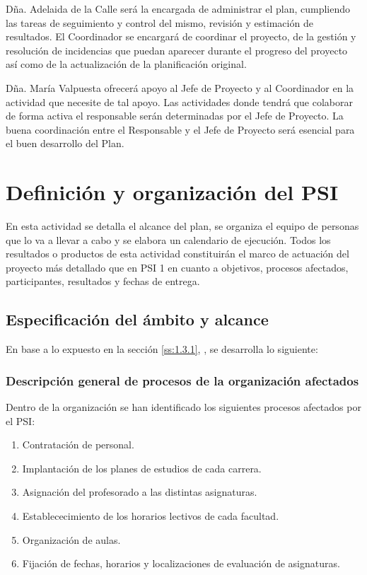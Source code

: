 \documentclass[11pt,a4paper,spanish,twoside]{book}
\begin{document}
Dña. Adelaida de la Calle será la encargada de administrar el plan,
cumpliendo las tareas de seguimiento y control del mismo, revisión y 
estimación de resultados. El Coordinador se encargará de coordinar el
proyecto, de la gestión y resolución de incidencias que puedan aparecer 
durante el progreso del proyecto así como de la actualización de la 
planificación original.

Dña. María Valpuesta ofrecerá apoyo al Jefe de Proyecto y al Coordinador en
la actividad que necesite de tal apoyo. Las actividades donde tendrá que 
colaborar de forma activa el responsable serán determinadas por el Jefe de 
Proyecto. La buena coordinación entre el Responsable y el Jefe de Proyecto 
será esencial para el buen desarrollo del Plan.


\chapter{Definición y organización del PSI}
En esta actividad se detalla el alcance del plan, se organiza el equipo de
personas que lo va a llevar a cabo y se elabora un calendario de
ejecución. Todos los resultados o productos de esta actividad constituirán el
marco de actuación del proyecto más detallado que en PSI 1 en cuanto a
objetivos, procesos afectados, participantes, resultados y fechas de
entrega. 

\section{Especificación del ámbito y alcance}
En base a lo expuesto en la sección \vref{ss:1.3.1}, \emph{},
se desarrolla lo siguiente:

\subsection{Descripción general de procesos de la organización afectados}
\label{ss:2.1.1}
Dentro de la organización se han identificado los siguientes procesos afectados 
por el PSI:
\begin{enumerate}
  \item Contratación de personal.
  \item Implantación de los planes de estudios de cada carrera.
  \item Asignación del profesorado a las distintas asignaturas.
  \item Establececimiento de los horarios lectivos de cada facultad.
  \item Organización de aulas.
  \item Fijación de fechas, horarios y localizaciones de evaluación de
    asignaturas. 
\end{enumerate}
\end{document}
